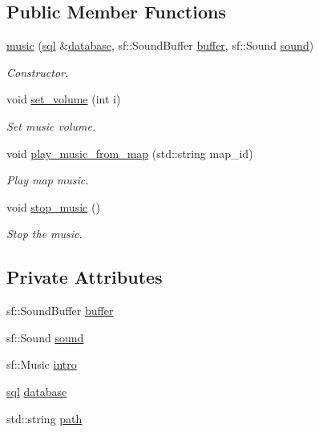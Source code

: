 \subsection*{Public Member Functions}
\begin{DoxyCompactItemize}
\item 
\hyperlink{classmusic_a08986f41efee0ffe77fcf819dd1bfc2d}{music} (\hyperlink{classsql}{sql} \&\hyperlink{classmusic_a483b70809538add9b52adcaaaddd3c7f}{database}, sf\+::\+Sound\+Buffer \hyperlink{classmusic_a20de39eece3638a2128136af4ad765e2}{buffer}, sf\+::\+Sound \hyperlink{classmusic_a14ba0b22d1e21a9c07b8b24ab50bbb10}{sound})
\begin{DoxyCompactList}\small\item\em Constructor. \end{DoxyCompactList}\item 
void \hyperlink{classmusic_aeb639e45c64ee79496e8ec6187cfcf70}{set\+\_\+volume} (int i)
\begin{DoxyCompactList}\small\item\em Set music volume. \end{DoxyCompactList}\item 
void \hyperlink{classmusic_ae7835578f75b785e1ef2a3d0db9420b9}{play\+\_\+music\+\_\+from\+\_\+map} (std\+::string map\+\_\+id)
\begin{DoxyCompactList}\small\item\em Play map music. \end{DoxyCompactList}\item 
void \hyperlink{classmusic_ae89df284db606b4fb68f9e99702a6872}{stop\+\_\+music} ()
\begin{DoxyCompactList}\small\item\em Stop the music. \end{DoxyCompactList}\end{DoxyCompactItemize}
\subsection*{Private Attributes}
\begin{DoxyCompactItemize}
\item 
sf\+::\+Sound\+Buffer \hyperlink{classmusic_a20de39eece3638a2128136af4ad765e2}{buffer}
\item 
sf\+::\+Sound \hyperlink{classmusic_a14ba0b22d1e21a9c07b8b24ab50bbb10}{sound}
\item 
sf\+::\+Music \hyperlink{classmusic_a08beb3c6befa97938b98edae5bc6ec39}{intro}
\item 
\hyperlink{classsql}{sql} \hyperlink{classmusic_a483b70809538add9b52adcaaaddd3c7f}{database}
\item 
std\+::string \hyperlink{classmusic_a14adc1380bd15d32bd1a7df66910dabf}{path}
\end{DoxyCompactItemize}


